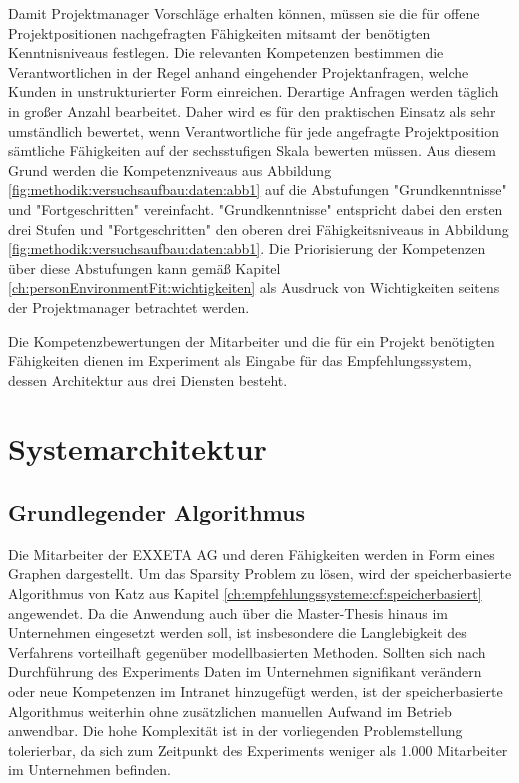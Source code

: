 Damit Projektmanager Vorschläge erhalten können, müssen sie die für offene Projektpositionen nachgefragten Fähigkeiten mitsamt der benötigten Kenntnisniveaus festlegen. Die relevanten Kompetenzen bestimmen die Verantwortlichen in der Regel anhand eingehender Projektanfragen, welche Kunden in unstrukturierter Form einreichen. Derartige Anfragen werden täglich in großer Anzahl bearbeitet. Daher wird es für den praktischen Einsatz als sehr umständlich bewertet, wenn Verantwortliche für jede angefragte Projektposition sämtliche Fähigkeiten auf der sechsstufigen Skala bewerten müssen. Aus diesem Grund werden die Kompetenzniveaus aus Abbildung \ref{fig:methodik:versuchsaufbau:daten:abb1} auf die Abstufungen "Grundkenntnisse" und "Fortgeschritten" vereinfacht. "Grundkenntnisse" entspricht dabei den ersten drei Stufen und "Fortgeschritten" den oberen drei Fähigkeitsniveaus in Abbildung \ref{fig:methodik:versuchsaufbau:daten:abb1}. Die Priorisierung der Kompetenzen über diese Abstufungen kann gemäß Kapitel \ref{ch:personEnvironmentFit:wichtigkeiten} als Ausdruck von Wichtigkeiten seitens der Projektmanager betrachtet werden.

Die Kompetenzbewertungen der Mitarbeiter und die für ein Projekt benötigten Fähigkeiten dienen im Experiment als Eingabe für das Empfehlungssystem, dessen Architektur aus drei Diensten besteht.%

\section{Systemarchitektur}
\label{ch:methodik:systemarchitektur}


\subsection{Grundlegender Algorithmus}
\label{ch:methodik:versuchsaufbau:grundlegend}
Die Mitarbeiter der EXXETA AG und deren Fähigkeiten werden in Form eines Graphen dargestellt. Um das Sparsity Problem zu lösen, wird der speicherbasierte Algorithmus von Katz aus Kapitel \ref{ch:empfehlungssysteme:cf:speicherbasiert} angewendet. Da die Anwendung auch über die Master-Thesis hinaus im Unternehmen eingesetzt werden soll, ist insbesondere die Langlebigkeit des Verfahrens vorteilhaft gegenüber modellbasierten Methoden. Sollten sich nach Durchführung des Experiments Daten im Unternehmen signifikant verändern oder neue Kompetenzen im Intranet hinzugefügt werden, ist der speicherbasierte Algorithmus weiterhin ohne zusätzlichen manuellen Aufwand im Betrieb anwendbar. Die hohe Komplexität ist in der vorliegenden Problemstellung tolerierbar, da sich zum Zeitpunkt des Experiments weniger als 1.000 Mitarbeiter im Unternehmen befinden.

